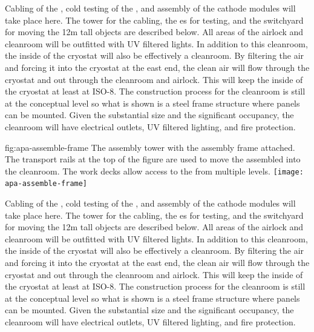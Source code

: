 Cabling of the , cold testing of the , and assembly of the cathode  modules will take place here. The tower for the  cabling, the \coldbox{}es for testing, and the switchyard for moving the 12m tall objects are described below. All areas of the airlock and cleanroom will be outfitted with UV filtered lights. In addition to this cleanroom, the inside of the cryostat will also be effectively a cleanroom.  By filtering the air and forcing it  into the cryostat at the east end, the clean air will flow through the cryostat and out through the cleanroom and airlock. This will keep the inside of the cryostat at least at ISO-8. The construction process for the cleanroom is still at the conceptual level so what is shown is a steel frame structure where panels can be mounted. %
Given the substantial size and the significant occupancy, the cleanroom will have electrical outlets, UV filtered lighting, and fire protection. 


\begin{dunefigure}{fig:apa-assemble-frame}
  {The  assembly tower with the  assembly frame attached. The transport rails at the top of the figure are used to move the assembled  into the cleanroom. The work decks allow access to the  from multiple levels. }
\texttt{[image: apa-assemble-frame]}
\end{dunefigure}


Cabling of the , cold testing of the , and assembly of the cathode  modules will take place here. The tower for the  cabling, the \coldbox{}es for testing, and the switchyard for moving the 12m tall objects are described below. All areas of the airlock and cleanroom will be outfitted with UV filtered lights. In addition to this cleanroom, the inside of the cryostat will also be effectively a cleanroom.  By filtering the air and forcing it  into the cryostat at the east end, the clean air will flow through the cryostat and out through the cleanroom and airlock. This will keep the inside of the cryostat at least at ISO-8. The construction process for the cleanroom is still at the conceptual level so what is shown is a steel frame structure where panels can be mounted. %
Given the substantial size and the significant occupancy, the cleanroom will have electrical outlets, UV filtered lighting, and fire protection. 




